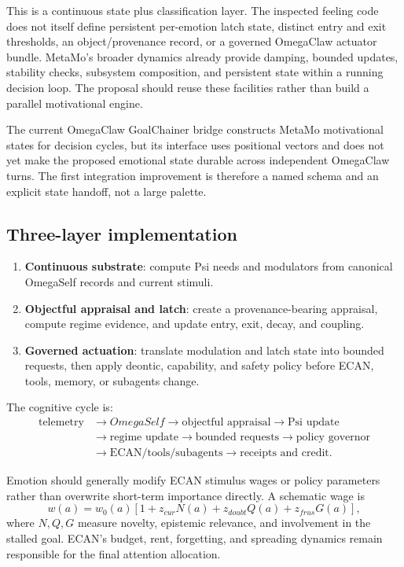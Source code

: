 \documentclass[11pt]{article}
\newcommand{\OmegaSelf}{\ensuremath{\mathit{OmegaSelf}}}
\begin{document}
This is a continuous state plus classification layer.  The inspected feeling
code does not itself define persistent per-emotion latch state, distinct entry
and exit thresholds, an object/provenance record, or a governed OmegaClaw
actuator bundle.  MetaMo's broader dynamics already provide damping, bounded
updates, stability checks, subsystem composition, and persistent state within a
running decision loop.  The proposal should reuse these facilities rather than
build a parallel motivational engine.

The current OmegaClaw GoalChainer bridge constructs MetaMo motivational states
for decision cycles, but its interface uses positional vectors and does not yet
make the proposed emotional state durable across independent OmegaClaw turns.
The first integration improvement is therefore a named schema and an explicit
state handoff, not a large palette.

\subsection{Three-layer implementation}

\begin{enumerate}[leftmargin=*]
  \item \textbf{Continuous substrate}: compute Psi needs and modulators from
  canonical OmegaSelf records and current stimuli.
  \item \textbf{Objectful appraisal and latch}: create a provenance-bearing
  appraisal, compute regime evidence, and update entry, exit, decay, and coupling.
  \item \textbf{Governed actuation}: translate modulation and latch state into
  bounded requests, then apply deontic, capability, and safety policy before ECAN,
  tools, memory, or subagents change.
\end{enumerate}

The cognitive cycle is:
\begin{align*}
\text{telemetry} &\to \OmegaSelf \to \text{objectful appraisal}
\to \text{Psi update}\\
&\to\text{regime update}\to\text{bounded requests}
\to\text{policy governor}\\
&\to\text{ECAN/tools/subagents}\to\text{receipts and credit}.
\end{align*}

Emotion should generally modify ECAN stimulus wages or policy parameters rather
than overwrite short-term importance directly.  A schematic wage is
\begin{equation}
w(a)=w_0(a)\left[1+z_{cur}N(a)+z_{doubt}Q(a)+z_{frus}G(a)\right],
\end{equation}
where $N,Q,G$ measure novelty, epistemic relevance, and involvement in the
stalled goal.  ECAN's budget, rent, forgetting, and spreading dynamics remain
responsible for the final attention allocation.
\end{document}
